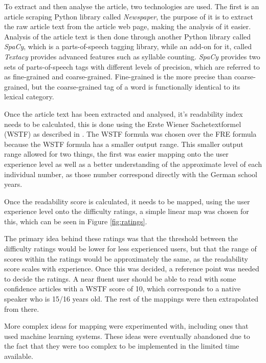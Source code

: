To extract and then analyse the article, two technologies are used. The first is an article scraping Python library called \textit{Newspaper}, the purpose of it is to extract the raw article text from the article web page, making the analysis of it easier. Analysis of the article text is then done through another Python library called \textit{SpaCy}, which is a parts-of-speech tagging library, while an add-on for it, called \textit{Textacy} provides advanced features such as syllable counting. \textit{SpaCy} provides two  sets of parts-of-speech tags with different levels of precision, which are referred to as fine-grained and coarse-grained. Fine-grained is the more precise than coarse-grained, but the coarse-grained tag of a word is functionally identical to its lexical category.

Once the article text has been extracted and analysed, it's readability index needs to be calculated, this is done using the Erste Wiener Sachetextformel (WSTF) as described in \textcite{bamberger1984}. The WSTF formula was chosen over the FRE formula because the WSTF formula has a smaller output range. This smaller output range allowed for two things, the first was easier mapping onto the user experience level as well as a better understanding of the approximate level of each individual number, as those number correspond directly with the German school years. 

Once the readability score is calculated, it needs to be mapped, using the user experience level onto the difficulty ratings, a simple linear map was chosen for this, which can be seen in Figure \ref{fig:ratings}.



The primary idea behind these ratings was that the threshold between the difficulty ratings would be lower for less experienced users, but that the range of scores within the ratings would be approximately the same, as the readability score scales with experience. Once this was decided, a reference point was needed to decide the ratings. A near fluent user should be able to read with some confidence articles with a WSTF score of 10, which corresponds to a native speaker who is 15/16 years old. The rest of the mappings were then extrapolated from there. 

More complex ideas for mapping were experimented with, including ones that used machine learning systems. These ideas were eventually abandoned due to the fact that they were too complex to be implemented in the limited time available. 

